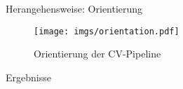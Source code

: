 \begin{frame}{Herangehensweise: Orientierung}
    \begin{figure}
        \centering
        \texttt{[image: imgs/orientation.pdf]}
        \caption{Orientierung der CV-Pipeline}
    \end{figure}
\end{frame}

\begin{frame}{Ergebnisse}
    \begin{columns}
        \begin{column}{0.5\linewidth}


        \end{column}
        \begin{column}{0.5\linewidth}


        \end{column}
    \end{columns}
\end{frame}

